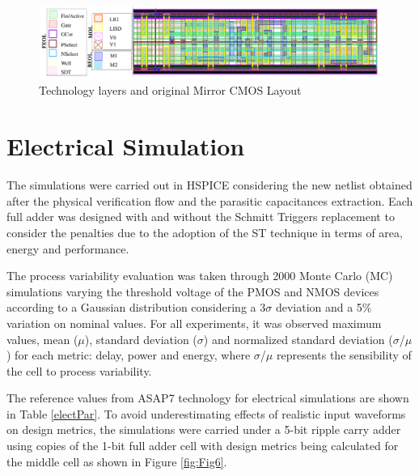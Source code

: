 \documentclass[ecp,tc, english]{iiufrgs}
\begin{document}
\begin{figure}[H]
\centering
\includegraphics[width=\textwidth]{Layers.pdf}
\caption{Technology layers and original Mirror CMOS Layout}
\label{fig:layers}
\end{figure}

\section{Electrical Simulation}

The simulations were carried out in HSPICE considering the new netlist obtained after the physical verification flow and the parasitic capacitances extraction. Each full adder was designed with and without the Schmitt Triggers replacement to consider the penalties due to the adoption of the ST technique in terms of area, energy and performance.

The process variability evaluation was taken through 2000 Monte Carlo (MC) simulations varying the threshold voltage of the PMOS and NMOS devices according to a Gaussian distribution considering a 3\(\sigma\) deviation and a 5\% variation on nominal values. For all experiments, it was observed maximum values, mean (\(\mu\)), standard deviation (\(\sigma\)) and normalized standard deviation (\(\sigma\)/\(\mu\)) for each metric: delay, power and energy, where \(\sigma\)/\(\mu\) represents the sensibility of the cell to process variability. 

The reference values from ASAP7 technology for electrical simulations are shown in Table \ref{electPar}. To avoid underestimating effects of realistic input waveforms on design metrics, the simulations were carried under a 5-bit ripple carry adder using copies of the 1-bit full adder cell with design metrics being calculated for the middle cell as shown in Figure \ref{fig:Fig6}. 
\end{document}

